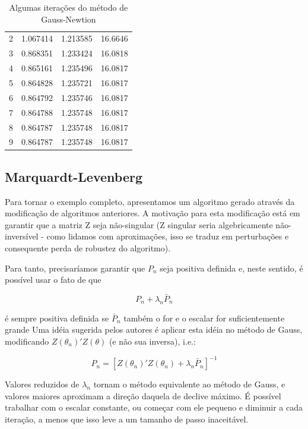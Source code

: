 \documentclass{abnt}
\begin{document}
\begin{table}
\begin{center}
\begin{tabular}{ r | c c r  }
                        2 & 1.067414 & 1.213585 & 16.6646 \\
                        3 & 0.868351 & 1.233424 & 16.0818 \\
                        4 & 0.865161 & 1.235496 & 16.0817 \\
                        5 & 0.864828 & 1.235721 & 16.0817 \\
                        6 & 0.864792 & 1.235746 & 16.0817 \\
                        7 & 0.864788 & 1.235748 & 16.0817 \\
                        8 & 0.864787 & 1.235748 & 16.0817 \\
                        9 & 0.864787 & 1.235748 & 16.0817 \\
                        \hline
                \end{tabular}
        \end{center}
        \caption{Algumas iterações do método de Gauss-Newtion}
        \label{resultados_gn}
\end{table}



\subsection{Marquardt-Levenberg}

Para tornar o exemplo completo, apresentamos um algoritmo gerado através da modificação de algoritmos anteriores. A motivação para esta modificação está em garantir que a matriz Z seja não-singular (Z singular seria algebricamente não-inversível - como lidamos com aproximações, isso se traduz em perturbações e consequente perda de robustez do algoritmo).

Para tanto, precisaríamos garantir que $P_n$ seja positiva definida e, neste sentido, é possível usar o fato de que

\[  P_n + \lambda_n\bar P_n \]

é sempre positiva definida se $\bar P_n$ também o for e o escalar for suficientemente grande Uma idéia sugerida pelos autores é aplicar esta idéia no método de Gauss, modificando $Z(\theta_n)'Z(\theta)$ (e não sua inversa), i.e.:

\[ P_n = [Z(\theta_n)'Z(\theta_n) + \lambda_n\bar P_n]^{-1} \]

	Valores reduzidos de $\lambda_n$ tornam o método equivalente ao método de Gauss, e valores maiores aproximam a direção daquela de declive máximo. É possível trabalhar com o escalar constante, ou começar com ele pequeno e diminuir a cada iteração, a menos que isso leve a um tamanho de passo inaceitável.
\end{document}
